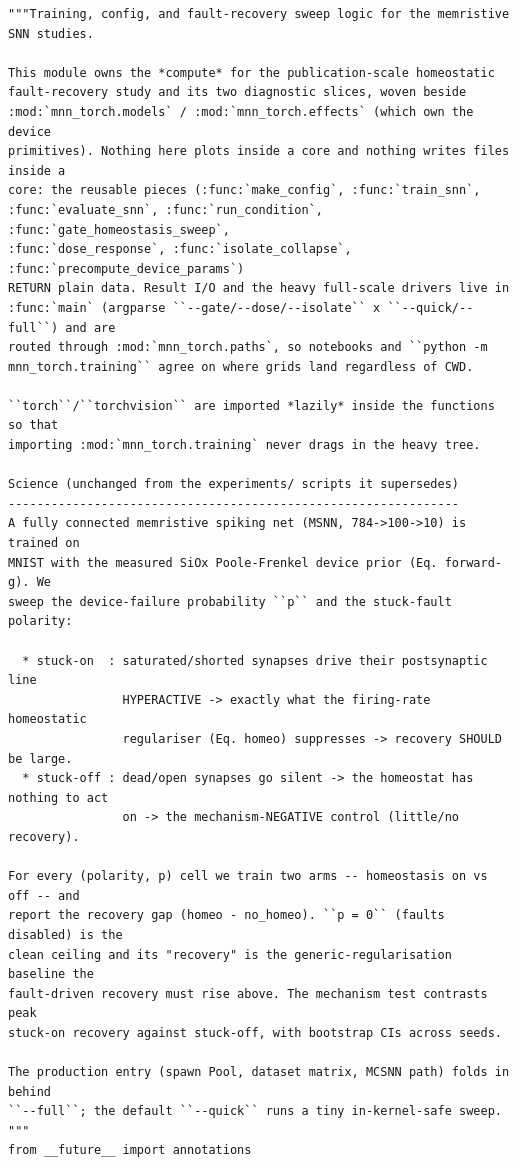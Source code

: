 \begin{lstlisting}[caption={mnn\_torch/training.py},label={lst:mnn-src-training}]
"""Training, config, and fault-recovery sweep logic for the memristive SNN studies.

This module owns the *compute* for the publication-scale homeostatic
fault-recovery study and its two diagnostic slices, woven beside
:mod:`mnn_torch.models` / :mod:`mnn_torch.effects` (which own the device
primitives). Nothing here plots inside a core and nothing writes files inside a
core: the reusable pieces (:func:`make_config`, :func:`train_snn`,
:func:`evaluate_snn`, :func:`run_condition`, :func:`gate_homeostasis_sweep`,
:func:`dose_response`, :func:`isolate_collapse`, :func:`precompute_device_params`)
RETURN plain data. Result I/O and the heavy full-scale drivers live in
:func:`main` (argparse ``--gate/--dose/--isolate`` x ``--quick/--full``) and are
routed through :mod:`mnn_torch.paths`, so notebooks and ``python -m
mnn_torch.training`` agree on where grids land regardless of CWD.

``torch``/``torchvision`` are imported *lazily* inside the functions so that
importing :mod:`mnn_torch.training` never drags in the heavy tree.

Science (unchanged from the experiments/ scripts it supersedes)
---------------------------------------------------------------
A fully connected memristive spiking net (MSNN, 784->100->10) is trained on
MNIST with the measured SiOx Poole-Frenkel device prior (Eq. forward-g). We
sweep the device-failure probability ``p`` and the stuck-fault polarity:

  * stuck-on  : saturated/shorted synapses drive their postsynaptic line
                HYPERACTIVE -> exactly what the firing-rate homeostatic
                regulariser (Eq. homeo) suppresses -> recovery SHOULD be large.
  * stuck-off : dead/open synapses go silent -> the homeostat has nothing to act
                on -> the mechanism-NEGATIVE control (little/no recovery).

For every (polarity, p) cell we train two arms -- homeostasis on vs off -- and
report the recovery gap (homeo - no_homeo). ``p = 0`` (faults disabled) is the
clean ceiling and its "recovery" is the generic-regularisation baseline the
fault-driven recovery must rise above. The mechanism test contrasts peak
stuck-on recovery against stuck-off, with bootstrap CIs across seeds.

The production entry (spawn Pool, dataset matrix, MCSNN path) folds in behind
``--full``; the default ``--quick`` runs a tiny in-kernel-safe sweep.
"""
from __future__ import annotations


\end{lstlisting}
